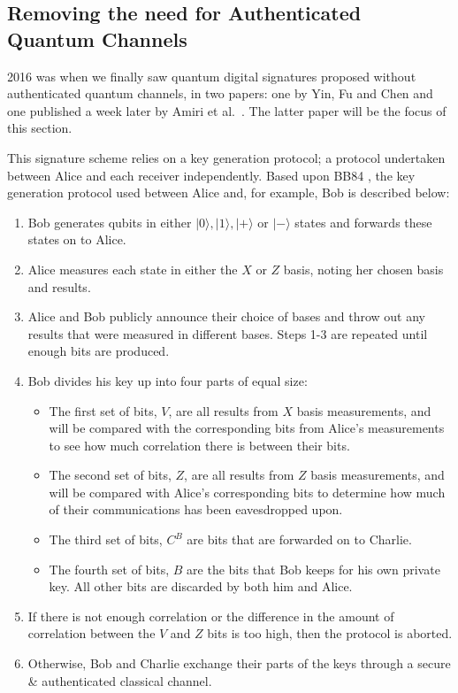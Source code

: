 \documentclass[%
 reprint,
 amsmath,amssymb,
 aps,
 pra,
]{revtex4-1}
\begin{document}
\subsection{Removing the need for Authenticated Quantum Channels}

2016 was when we finally saw quantum digital signatures proposed without authenticated quantum channels, in two papers: one by Yin, Fu and Chen \cite{PhysRevA.93.032316} and one published a week later by Amiri et al.\ \cite{PhysRevA.93.032325}. The latter paper will be the focus of this section.

This signature scheme relies on a key generation protocol; a protocol undertaken between Alice and each receiver independently. Based upon BB84 \cite{BB84}, the key generation protocol used between Alice and, for example, Bob is described below:

\begin{enumerate}
\item Bob generates qubits in either $|0\rangle, |1\rangle, |+\rangle \text{ or } |-\rangle$ states and forwards these states on to Alice.
\item Alice measures each state in either the $X$ or $Z$ basis, noting her chosen basis and results.
\item Alice and Bob publicly announce their choice of bases and throw out any results that were measured in different bases. Steps 1-3 are repeated until enough bits are produced.
\item Bob divides his key up into four parts of equal size:
\begin{itemize}
\item The first set of bits, $V$, are all results from $X$ basis measurements, and will be compared with the corresponding bits from Alice's measurements to see how much correlation there is between their bits.
\item The second set of bits, $Z$, are all results from $Z$ basis measurements, and will be compared with Alice's corresponding bits to determine how much of their communications has been eavesdropped upon.
\item The third set of bits, $C^B$ are bits that are forwarded on to Charlie.
\item The fourth set of bits, $B$ are the bits that Bob keeps for his own private key. All other bits are discarded by both him and Alice.
\end{itemize}
\item If there is not enough correlation or the difference in the amount of correlation between the $V$ and $Z$ bits is too high, then the protocol is aborted.
\item Otherwise, Bob and Charlie exchange their parts of the keys through a secure \& authenticated classical channel.
\end{enumerate}
\end{document}
